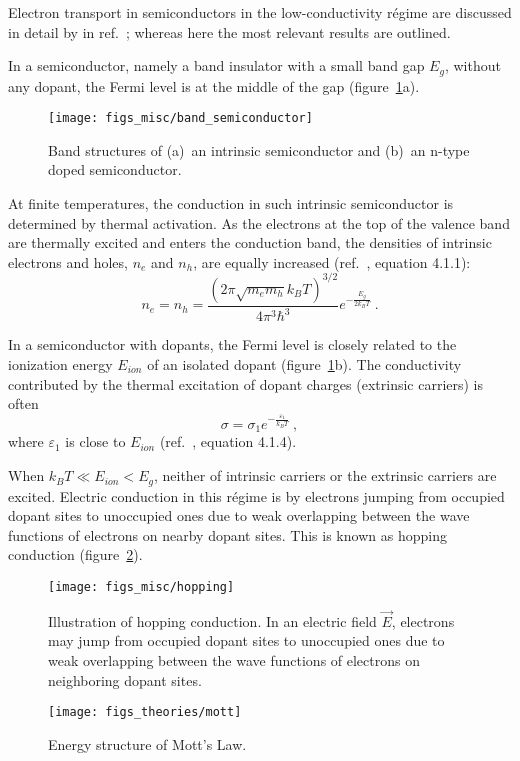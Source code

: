Electron transport in semiconductors in the low-conductivity r\'egime are discussed in detail by \citeauthor{schklovskii_efros} in ref.~\cite{schklovskii_efros}; whereas here the most relevant results are outlined.

In a semiconductor, namely a band insulator with a small band gap $E_g$, without any dopant, the Fermi level is at the middle of the gap (figure~\ref{fig:band_semiconductor}a). %
\begin{figure}[ht]%
    \centering%
    \texttt{[image: figs\_misc/band\_semiconductor]}%
    \caption[Band structures of an intrinsic semiconductor and an n-type doped semiconductor]{\label{fig:band_semiconductor}Band structures of (a)~an intrinsic semiconductor and (b)~an n-type doped semiconductor.}%
\end{figure}%
%
At finite temperatures, the conduction in such intrinsic semiconductor is determined by thermal activation. As the electrons at the top of the valence band are thermally excited and enters the conduction band, the densities of intrinsic electrons and holes, $n_e$ and $n_h$, are equally increased (ref.~\cite{schklovskii_efros}, equation 4.1.1):%
\begin{equation}
    n_e = n_h = \frac{\left(2\pi\sqrt{m_e m_h}k_B T\right)^{3/2}}{4\pi^3\hbar^3}e^{-\frac{E_g}{2 k_B T}}~.
\end{equation}

In a semiconductor with dopants, the Fermi level is closely related to the ionization energy $E_{ion}$ of an isolated dopant (figure~\ref{fig:band_semiconductor}b). The conductivity contributed by the thermal excitation of dopant charges (extrinsic carriers) is often%
\begin{equation}
    \sigma = \sigma_1 e^{-\frac{\varepsilon_1}{k_B T}}~,
\end{equation}%
where $\varepsilon_1$ is close to $E_{ion}$ (ref.~\cite{schklovskii_efros}, equation 4.1.4).

When $k_B T \ll E_{ion} < E_g$, neither of intrinsic carriers or the extrinsic carriers are excited. Electric conduction in this r\'egime is by electrons jumping from occupied dopant sites to unoccupied ones due to weak overlapping between the wave functions of electrons on nearby dopant sites. This is known as hopping conduction (figure~\ref{fig:hopping}).%
\begin{figure}[ht]%
    \centering%
    \texttt{[image: figs\_misc/hopping]}%
    \caption[Illustration of hopping conduction]{\label{fig:hopping}Illustration of hopping conduction. In an electric field $\vec{E}$, electrons may jump from occupied dopant sites to unoccupied ones due to weak overlapping between the wave functions of electrons on neighboring dopant sites.}%
\end{figure}%

%
\begin{figure}[ht]%
    \centering%
    \texttt{[image: figs\_theories/mott]}%
    \caption[Energy structure of Mott's Law]{\label{fig:mott}Energy structure of Mott's Law.}%
\end{figure}%